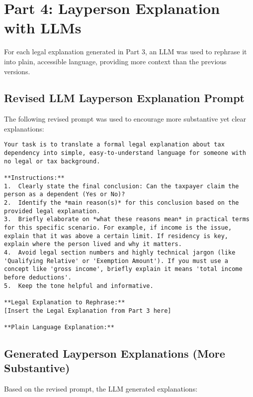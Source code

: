 \documentclass[11pt, letterpaper]{article}
\begin{document}
\section{Part 4: Layperson Explanation with LLMs}

For each legal explanation generated in Part 3, an LLM was used to rephrase it into plain, accessible language, providing more context than the previous versions.

\subsection{Revised LLM Layperson Explanation Prompt}
The following revised prompt was used to encourage more substantive yet clear explanations:
\begin{lstlisting}[style=promptstyle, caption={Revised LLM Prompt for Generating Layperson Explanations}]
Your task is to translate a formal legal explanation about tax dependency into simple, easy-to-understand language for someone with no legal or tax background.

**Instructions:**
1.  Clearly state the final conclusion: Can the taxpayer claim the person as a dependent (Yes or No)?
2.  Identify the *main reason(s)* for this conclusion based on the provided legal explanation.
3.  Briefly elaborate on *what these reasons mean* in practical terms for this specific scenario. For example, if income is the issue, explain that it was above a certain limit. If residency is key, explain where the person lived and why it matters.
4.  Avoid legal section numbers and highly technical jargon (like 'Qualifying Relative' or 'Exemption Amount'). If you must use a concept like 'gross income', briefly explain it means 'total income before deductions'.
5.  Keep the tone helpful and informative.

**Legal Explanation to Rephrase:**
[Insert the Legal Explanation from Part 3 here]

**Plain Language Explanation:**
\end{lstlisting}

\subsection{Generated Layperson Explanations (More Substantive)}
Based on the revised prompt, the LLM generated explanations:
\end{document}
